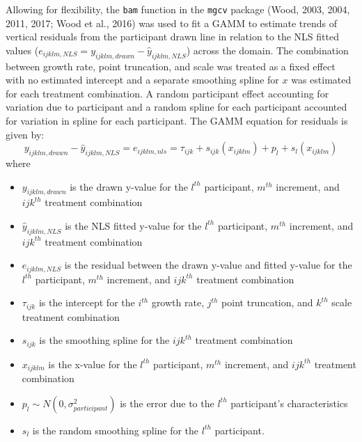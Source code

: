 \documentclass[print]{nuthesis}
\providecommand{\tightlist}{%
  \setlength{\itemsep}{0pt}\setlength{\parskip}{0pt}}
\begin{document}
Allowing for flexibility, the \texttt{bam} function in the \texttt{mgcv} package (Wood, 2003, 2004, 2011, 2017; Wood et al., 2016) was used to fit a GAMM to estimate trends of vertical residuals from the participant drawn line in relation to the NLS fitted values (\(e_{ijklm,NLS} = y_{ijklm,drawn} - \hat y_{ijklm,NLS}\)) across the domain.
The combination between growth rate, point truncation, and scale was treated as a fixed effect with no estimated intercept and a separate smoothing spline for \(x\) was estimated for each treatment combination.
A random participant effect accounting for variation due to participant and a random spline for each participant accounted for variation in spline for each participant.
The GAMM equation for residuals is given by:
\begin{equation}
y_{ijklm,drawn} - \hat y_{ijklm,NLS} = e_{ijklm,nls} = \tau_{ijk} + s_{ijk}(x_{ijklm}) + p_{l} + s_{l}(x_{ijklm})
\end{equation}
\noindent where

\begin{itemize}
\tightlist
\item
  \(y_{ijklm,drawn}\) is the drawn y-value for the \(l^{th}\) participant, \(m^{th}\) increment, and \(ijk^{th}\) treatment combination
\item
  \(\hat y_{ijklm,NLS}\) is the NLS fitted y-value for the \(l^{th}\) participant, \(m^{th}\) increment, and \(ijk^{th}\) treatment combination
\item
  \(e_{ijklm,NLS}\) is the residual between the drawn y-value and fitted y-value for the \(l^{th}\) participant, \(m^{th}\) increment, and \(ijk^{th}\) treatment combination
\item
  \(\tau_{ijk}\) is the intercept for the \(i^{th}\) growth rate, \(j^{th}\) point truncation, and \(k^{th}\) scale treatment combination
\item
  \(s_{ijk}\) is the smoothing spline for the \(ijk^{th}\) treatment combination
\item
  \(x_{ijklm}\) is the x-value for the \(l^{th}\) participant, \(m^{th}\) increment, and \(ijk^{th}\) treatment combination
\item
  \(p_{l} \sim N(0, \sigma^2_{participant})\) is the error due to the \(l^{th}\) participant's characteristics
\item
  \(s_{l}\) is the random smoothing spline for the \(l^{th}\) participant.
\end{itemize}
\end{document}
